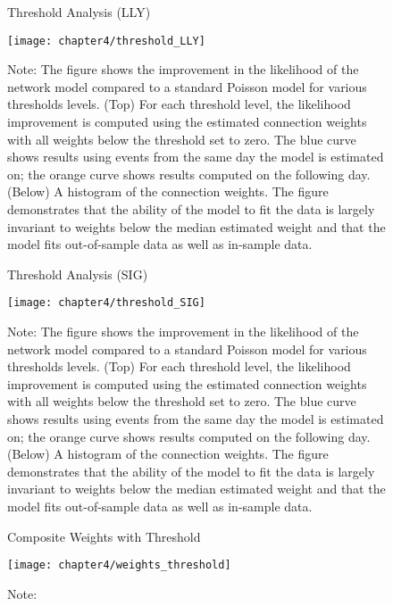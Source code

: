 		\begin{figure}[ht!]
			\small
			\linespread{1}
			\centering
			\captionsetup{labelsep=colon, font=footnotesize, justification=centerfirst, width=\linewidth}
			\caption{Threshold Analysis (LLY)}
			\label{fig:threshold_LLY}
			\texttt{[image: chapter4/threshold\_LLY]}
			\captionsetup{position=below, font=footnotesize, justification=justified, width=\linewidth}
			\caption*{Note: The figure shows the improvement in the likelihood of the network model compared to a standard Poisson model for various thresholds levels. (Top) For each threshold level, the likelihood improvement is computed using the estimated connection weights with all weights below the threshold set to zero. The blue curve shows results using events from the same day the model is estimated on; the orange curve shows results computed on the following day. (Below) A histogram of the connection weights. The figure demonstrates that the ability of the model to fit the data is largely invariant to weights below the median estimated weight and that the model fits out-of-sample data as well as in-sample data.}
		\end{figure}

		\begin{figure}[ht!]
			\small
			\linespread{1}
			\centering
			\captionsetup{labelsep=colon, font=footnotesize, justification=centerfirst, width=\linewidth}
			\caption{Threshold Analysis (SIG)}
			\label{fig:threshold_SIG}
			\texttt{[image: chapter4/threshold\_SIG]}
			\captionsetup{position=below, font=footnotesize, justification=justified, width=\linewidth}
			\caption*{Note: The figure shows the improvement in the likelihood of the network model compared to a standard Poisson model for various thresholds levels. (Top) For each threshold level, the likelihood improvement is computed using the estimated connection weights with all weights below the threshold set to zero. The blue curve shows results using events from the same day the model is estimated on; the orange curve shows results computed on the following day. (Below) A histogram of the connection weights. The figure demonstrates that the ability of the model to fit the data is largely invariant to weights below the median estimated weight and that the model fits out-of-sample data as well as in-sample data.}
		\end{figure}

		\begin{figure}[ht!]
			\small
			\linespread{1}
			\centering
			\captionsetup{labelsep=colon, font=footnotesize, justification=centerfirst, width=\linewidth}
			\caption{Composite Weights with Threshold}
			\label{fig:weights_threshold}
			\texttt{[image: chapter4/weights\_threshold]}
			\captionsetup{position=below, font=footnotesize, justification=justified, width=\linewidth}
			\caption*{Note:}
		\end{figure}


